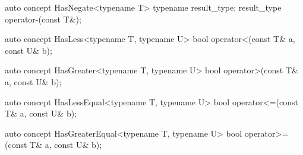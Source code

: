 \documentclass[american,twoside]{book}
\begin{document}
\begin{itemdecl}
auto concept HasNegate<typename T> {
  typename result_type;
  result_type operator-(const T&);
}
\end{itemdecl}

\begin{itemdescr}
\pnum
{}
\end{itemdescr}

\begin{itemdecl}
auto concept HasLess<typename T, typename U> {
  bool operator<(const T& a, const U& b);
}
\end{itemdecl}

\begin{itemdescr}
\pnum
{}
\end{itemdescr}

\begin{itemdecl}
auto concept HasGreater<typename T, typename U> {
  bool operator>(const T& a, const U& b);
}
\end{itemdecl}

\begin{itemdescr}
\pnum
{}
\end{itemdescr}

\begin{itemdecl}
auto concept HasLessEqual<typename T, typename U> {
  bool operator<=(const T& a, const U& b);
}
\end{itemdecl}

\begin{itemdescr}
\pnum
{}
\end{itemdescr}

\begin{itemdecl}
auto concept HasGreaterEqual<typename T, typename U> {
  bool operator>=(const T& a, const U& b);
}
\end{itemdecl}

\begin{itemdescr}
\pnum
{}
\end{itemdescr}

\pnum
{}
\end{document}
